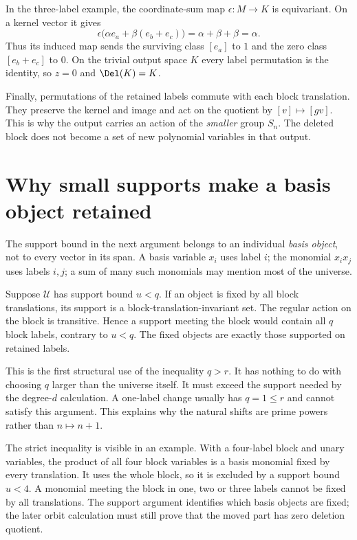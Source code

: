 In the three-label example, the coordinate-sum map
$\epsilon:M\to K$ is equivariant. On a kernel vector it gives
\[
 \epsilon\bigl(\alpha e_a+\beta(e_b+e_c)\bigr)
                       =\alpha+\beta+\beta=\alpha.
\]
Thus its induced map sends the surviving class $[e_a]$ to $1$
and the zero class $[e_b+e_c]$ to $0$. On the trivial output
space $K$ every label permutation is the identity, so $z=0$ and
$\Del(K)=K$.

Finally, permutations of the retained labels commute with each
block translation. They preserve the kernel and image and act on
the quotient by $[v]\mapsto[g v]$. This is why the output carries
an action of the \emph{smaller} group $S_n$. The deleted block
does not become a set of new polynomial variables in that output.

\section{Why small supports make a basis object retained}
The support bound in the next argument belongs to an individual
\emph{basis object}, not to every vector in its span. A basis variable
$x_i$ uses label $i$; the monomial $x_i x_j$ uses labels $i,j$;
a sum of many such monomials may mention most of the universe.

Suppose $\mathcal U$ has support bound $u<q$. If an object is fixed by
all block translations, its support is a block-translation-invariant set.
The regular action on the block is transitive. Hence a support meeting
the block would contain all $q$ block labels, contrary to $u<q$.
The fixed objects are exactly those supported on retained labels.

This is the first structural use of the inequality $q>r$. It has nothing
to do with choosing $q$ larger than the universe itself. It must exceed
the support needed by the degree-$d$ calculation. A one-label change
usually has $q=1\le r$ and cannot satisfy this argument. This explains
why the natural shifts are prime powers rather than $n\mapsto n+1$.

The strict inequality is visible in an example. With a four-label
block and unary variables, the product of all four block variables
is a basis monomial fixed by every translation. It uses the whole
block, so it is excluded by a support bound $u<4$. A monomial
meeting the block in one, two or three labels cannot be fixed by
all translations.
The support argument identifies which basis objects are fixed;
the later orbit calculation must still prove that the moved part
has zero deletion quotient.

